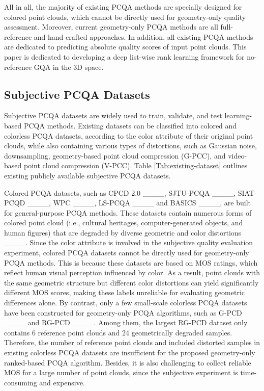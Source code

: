 All in all, the majority of existing PCQA methods are specially designed for colored point clouds, which cannot be directly used for geometry-only quality assessment.
Moreover, current geometry-only PCQA methods are all full-reference and hand-crafted approaches.
In addition, all existing  PCQA methods are dedicated to predicting absolute quality scores of input point clouds.
This paper is dedicated to developing a deep list-wise rank learning framework for no-reference GQA in the 3D space.

\subsection{Subjective PCQA Datasets}

Subjective PCQA datasets are widely used to train, validate, and test learning-based PCQA methods.
Existing datasets can be classified into colored and colorless PCQA datasets, according to the color attribute of their original point clouds, while also containing various types of distortions, such as Gaussian noise, downsampling, geometry-based point cloud compression (G-PCC), and video-based point cloud compression (V-PCC).
Table \ref{Tab:existing-dataset} outlines existing publicly available subjective PCQA datasets.



Colored PCQA datasets, such as CPCD 2.0 ____, SJTU-PCQA ____, SIAT-PCQD ____, WPC ____, LS-PCQA ____ and BASICS ____, are built for general-purpose PCQA methods.
These datasets contain numerous forms of colored point cloud (i.e., cultural heritages, computer-generated objects, and human figures) that are degraded by diverse geometric and color distortions ____.
Since the color attribute is involved in the subjective quality evaluation experiment, colored PCQA datasets cannot be directly used for geometry-only PCQA methods. 
This is because these datasets are based on MOS ratings, which reflect human visual perception influenced by color. 
As a result, point clouds with the same geometric structure but different color distortions can yield significantly different MOS scores, making these labels unreliable for evaluating geometric differences alone.
By contrast, only a few small-scale colorless PCQA datasets have been constructed for geometry-only PCQA algorithms, such as G-PCD ____ and RG-PCD ____.
Among them, the largest RG-PCD dataset only contains 6 reference point clouds and 24 geometrically degraded samples.
Therefore, the number of reference point clouds and included distorted samples in existing colorless PCQA datasets are insufficient for the proposed geometry-only ranked-based PCQA algorithm.
Besides, it is also challenging to collect reliable MOS for a large number of point clouds, since the subjective experiment is time-consuming and expensive. 

